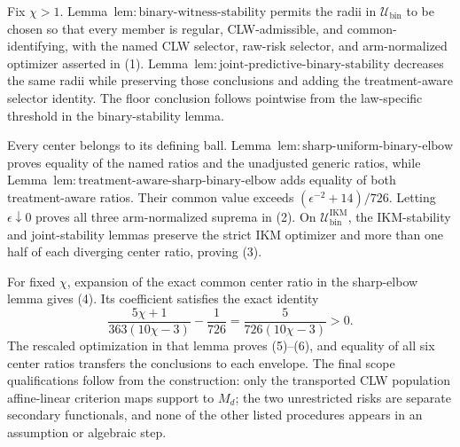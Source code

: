 Fix \(\chi>1\). Lemma~\(\mathrm{lem{:}binary\text{-}witness\text{-}stability}\) permits the radii in \(\mathcal U_{\mathrm{bin}}\) to be chosen so that every member is regular, CLW-admissible, and common-identifying, with the named CLW selector, raw-risk selector, and arm-normalized optimizer asserted in (1). Lemma~\(\mathrm{lem{:}joint\text{-}predictive\text{-}binary\text{-}stability}\) decreases the same radii while preserving those conclusions and adding the treatment-aware selector identity. The floor conclusion follows pointwise from the law-specific threshold in the binary-stability lemma.

Every center belongs to its defining ball. Lemma~\(\mathrm{lem{:}sharp\text{-}uniform\text{-}binary\text{-}elbow}\) proves equality of the named ratios and the unadjusted generic ratios, while Lemma~\(\mathrm{lem{:}treatment\text{-}aware\text{-}sharp\text{-}binary\text{-}elbow}\) adds equality of both treatment-aware ratios. Their common value exceeds \((\epsilon^{-2}+14)/726\). Letting \(\epsilon\downarrow0\) proves all three arm-normalized suprema in (2). On \(\mathcal U_{\mathrm{bin}}^{\mathrm{IKM}}\), the IKM-stability and joint-stability lemmas preserve the strict IKM optimizer and more than one half of each diverging center ratio, proving (3).

For fixed \(\chi\), expansion of the exact common center ratio in the sharp-elbow lemma gives (4). Its coefficient satisfies the exact identity
\[
 \frac{5\chi+1}{363(10\chi-3)}-\frac{1}{726}
 =\frac{5}{726(10\chi-3)}>0.                              \tag{41}
\]
The rescaled optimization in that lemma proves (5)--(6), and equality of all six center ratios transfers the conclusions to each envelope. The final scope qualifications follow from the construction: only the transported CLW population affine-linear criterion maps support to \(M_d\); the two unrestricted risks are separate secondary functionals, and none of the other listed procedures appears in an assumption or algebraic step.